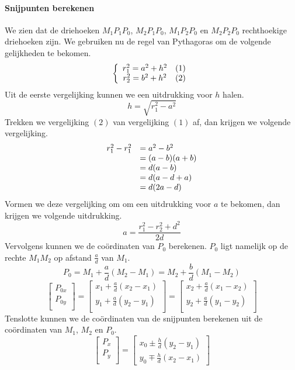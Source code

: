 \paragraph{Snijpunten berekenen}
We zien dat de driehoeken $M_1P_1P_0$, $M_2P_1P_0$, $M_1P_2P_0$ en $M_2P_2P_0$ rechthoekige driehoeken zijn. We gebruiken nu de regel van Pythagoras om de volgende gelijkheden te bekomen.
\[
\left\{
\begin{array}{c l r}
r_1^2 = a^2 + h^2 & (1)\\
r_2^2 = b^2 + h^2 & (2)
\end{array}
\right.
\]
Uit de eerste vergelijking kunnen we een uitdrukking voor $h$ halen.
\[
h = \sqrt{r_{1}^{2}-a^{2}}
\]
Trekken we vergelijking $(2)$ van vergelijking $(1)$ af, dan krijgen we volgende vergelijking.
\[
\begin{array}{r l}
r_1^2 -r_1^2 & = a^2 - b^2\\
& = (a-b)(a+b)\\
& = d(a-b)\\
& = d(a-d+a)\\
& = d(2a-d)
\end{array}
\]
Vormen we deze vergelijking om om een uitdrukking voor $a$ te bekomen, dan krijgen we volgende uitdrukking.
\[
a = \frac{r_1^2-r_2^2 + d^2}{2d}
\]
Vervolgens kunnen we de co\"ordinaten van $P_0$ berekenen. $P_0$ ligt namelijk op de rechte $M_1M_2$ op afstand $\frac{a}{d}$ van $M_1$.
\[
P_0 = M_1 + \frac{a}{d}(M_2-M_1) = M_2 + \frac{b}{d}(M_1-M_2)
\]
\[
\begin{bmatrix}
P_{0x}\\P_{0y}\\
\end{bmatrix}
=
\begin{bmatrix}
x_1 + \frac{a}{d}(x_2-x_1)\\
y_1 + \frac{a}{d}(y_2-y_1)\\
\end{bmatrix}
=
\begin{bmatrix}
x_2 + \frac{a}{d}(x_1-x_2)\\
y_2 + \frac{a}{d}(y_1-y_2)\\
\end{bmatrix}
\]
Tenslotte kunnen we de co\"ordinaten van de snijpunten berekenen uit de co\"ordinaten van $M_1$, $M_2$ en $P_0$.
\[
\begin{bmatrix}
P_x\\P_y\\
\end{bmatrix}
=
\begin{bmatrix}
x_0 \pm \frac{h}{d}(y_2-y_1)\\
y_0 \mp \frac{h}{d}(x_2-x_1)
\end{bmatrix}
\]

